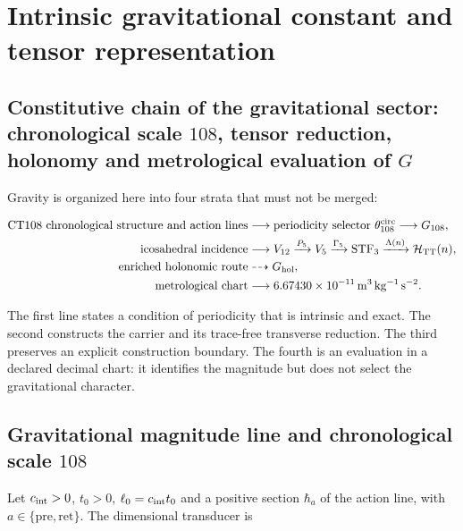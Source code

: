 \section{Intrinsic gravitational constant and tensor representation}
\label{rm:ch:gravity}

\subsection{Constitutive chain of the gravitational sector: chronological scale \texorpdfstring{\(108\)}{108}, tensor reduction, holonomy and metrological evaluation of \texorpdfstring{\(G\)}{G}}

Gravity is organized here into four strata that must not be merged:

\begin{equation}
\label{rm:eq:gravity-causal-chain}
\begin{aligned}
\text{CT108 chronological structure and action lines}
&\longrightarrow \text{periodicity selector }\theta_{108}^{\rm circ}
\longrightarrow G_{108},\\
\text{icosahedral incidence}
&\longrightarrow V_{12}\xrightarrow{P_5}V_5
\xrightarrow{\Gamma_5}\operatorname{STF}_3
\xrightarrow{\Lambda(n)}\mathcal H_{\rm TT}(n),\\
\text{enriched holonomic route}
&\dashrightarrow G_{\rm hol},\\
\text{metrological chart}
&\longrightarrow 6.67430\times10^{-11}\,
\mathrm{m^3\,kg^{-1}\,s^{-2}}.
\end{aligned}
\end{equation}

The first line states a condition of periodicity that is intrinsic and exact.
The second constructs the carrier and its trace-free transverse reduction. The third preserves an
explicit construction boundary. The fourth is an evaluation in a
declared decimal chart: it identifies the magnitude but does not select the gravitational
character.

\subsection{Gravitational magnitude line and chronological scale \texorpdfstring{\(108\)}{108}}

Let \(c_{\rm int}>0\), \(t_0>0\),
\(\ell_0=c_{\rm int}t_0\) and a positive section
\(\hbar_a\) of the action line, with
\(a\in\{\mathrm{pre},\mathrm{ret}\}\). The dimensional transducer is

